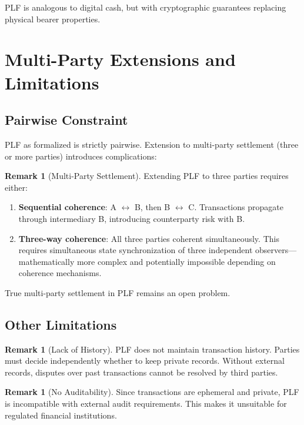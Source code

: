 \documentclass[twocolumn,10pt,a4paper]{article}
\theoremstyle{plain}
\theoremstyle{definition}
\newtheorem{remark}[theorem]{Remark}
\begin{document}
PLF is analogous to digital cash, but with cryptographic guarantees replacing physical bearer properties.

\section{Multi-Party Extensions and Limitations}
\label{sec:limitations}

\subsection{Pairwise Constraint}

PLF as formalized is strictly pairwise. Extension to multi-party settlement (three or more parties) introduces complications:

\begin{remark}[Multi-Party Settlement]
Extending PLF to three parties requires either:
\begin{enumerate}
\item \textbf{Sequential coherence}: A $\leftrightarrow$ B, then B $\leftrightarrow$ C. Transactions propagate through intermediary B, introducing counterparty risk with B.
\item \textbf{Three-way coherence}: All three parties coherent simultaneously. This requires simultaneous state synchronization of three independent observers—mathematically more complex and potentially impossible depending on coherence mechanisms.
\end{enumerate}
\end{remark}

True multi-party settlement in PLF remains an open problem.

\subsection{Other Limitations}

\begin{remark}[Lack of History]
PLF does not maintain transaction history. Parties must decide independently whether to keep private records. Without external records, disputes over past transactions cannot be resolved by third parties.
\end{remark}

\begin{remark}[No Auditability]
Since transactions are ephemeral and private, PLF is incompatible with external audit requirements. This makes it unsuitable for regulated financial institutions.
\end{remark}
\end{document}
